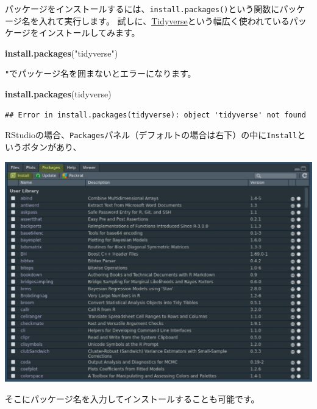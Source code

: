 \documentclass[]{bxjsreport}
\newenvironment{Shaded}{\begin{snugshade}}{\end{snugshade}}
\newcommand{\KeywordTok}[1]{\textcolor[rgb]{0.13,0.29,0.53}{\textbf{#1}}}
\newcommand{\NormalTok}[1]{#1}
\newcommand{\StringTok}[1]{\textcolor[rgb]{0.31,0.60,0.02}{#1}}
\begin{document}
パッケージをインストールするには、\texttt{install.packages()}という関数にパッケージ名を入れて実行します。
試しに、\href{https://www.tidyverse.org/}{Tidyverse}という幅広く使われているパッケージをインストールしてみます。

\begin{Shaded}
\begin{Highlighting}[]
\KeywordTok{install.packages}\NormalTok{(}\StringTok{"tidyverse"}\NormalTok{)}
\end{Highlighting}
\end{Shaded}

\texttt{"}でパッケージ名を囲まないとエラーになります。

\begin{Shaded}
\begin{Highlighting}[]
\KeywordTok{install.packages}\NormalTok{(tidyverse)}
\end{Highlighting}
\end{Shaded}

\begin{verbatim}
## Error in install.packages(tidyverse): object 'tidyverse' not found
\end{verbatim}

RStudioの場合、\texttt{Packages}パネル（デフォルトの場合は右下）の中に\texttt{Install}というボタンがあり、

\includegraphics{figures/intro_r2.jpg}

そこにパッケージ名を入力してインストールすることも可能です。
\end{document}
